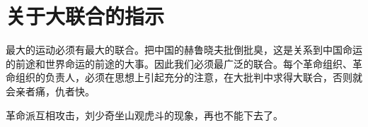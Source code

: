\section[关于大联合的指示（一九六七年八月）]{关于大联合的指示}


最大的运动必须有最大的联合。把中国的赫鲁晓夫批倒批臭，这是关系到中国命运的前途和世界命运的前途的大事。因此我们必须最广泛的联合。每个革命组织、革命组织的负责人，必须在思想上引起充分的注意，在大批判中求得大联合，否则就会亲者痛，仇者快。

革命派互相攻击，刘少奇坐山观虎斗的现象，再也不能下去了。



